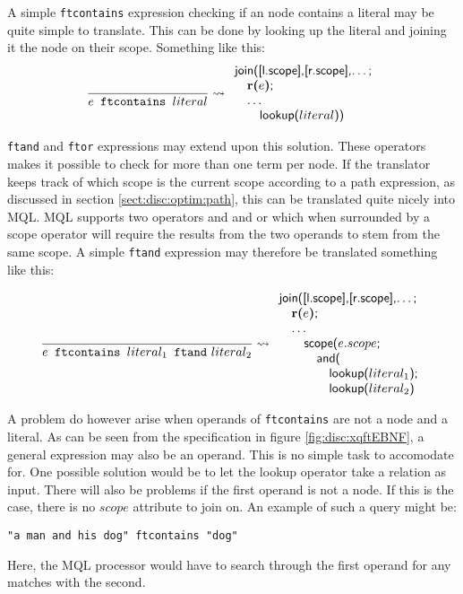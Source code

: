 A simple \texttt{ftcontains} expression checking if an node contains a literal may be quite simple to translate.
This can be done by looking up the literal and joining it the node on their scope. Something like this:
\begin{equation*}
\frac{}{e \mbox{\texttt{ ftcontains }}literal}\leadsto
\begin{array}{l}
\mbox{\textsf{join([l.scope],[r.scope],\ldots;}} \\ \quad
\mbox{\textbf{r(}}e\mbox{\textbf{)}\textsf{;}} \\ \quad
\mbox{\textsf{\ldots}} \\ \quad\quad
\mbox{\textsf{lookup(}}literal\textsf{))}
\end{array}
\end{equation*}

\texttt{ftand} and \texttt{ftor} expressions may extend upon this solution. These operators makes it possible to
check for more than one term per node. If the translator keeps track of which scope is the current scope according
to a path expression, as discussed in section \ref{sect:disc:optim:path}, this can be translated quite nicely into
MQL. MQL supports two operators \textsf{and} and \textsf{or} which when surrounded by a \textsf{scope} operator
will require the results from the two operands to stem from the same scope. A simple \texttt{ftand} expression may
therefore be translated something like this:

\begin{equation*}
\frac{}{e \mbox{\texttt{ ftcontains }}literal_1 \mbox{\texttt{ ftand} }literal_2}\leadsto
\begin{array}{l}
\mbox{\textsf{join([l.scope],[r.scope],\ldots;}} \\ \quad
\mbox{\textbf{r(}}e\mbox{\textbf{)}\textsf{;}} \\ \quad
\mbox{\textsf{\ldots}} \\ \quad\quad
\mbox{\textsf{scope(}}e.scope\mbox{\textsf{;}} \\ \quad\quad\quad
\mbox{\textsf{and(}} \\ \quad\quad\quad\quad
\mbox{\textsf{lookup(}}literal_1\textsf{);}\\ \quad\quad\quad\quad
\mbox{\textsf{lookup(}}literal_2\textsf{)}
\end{array}
\end{equation*}

A problem do however arise when operands of \texttt{ftcontains} are not a node and a literal. As can be seen from
the specification in figure \ref{fig:disc:xqftEBNF}, a general expression may also be an operand. This is no
simple task to accomodate for. One possible solution would be to let the \textsf{lookup} operator take a relation
as input. There will also be problems if the first operand is not a node. If this is the case, there is no $scope$
attribute to join on. An example of such a query might be: 
\begin{center}
\texttt{"a man and his dog" ftcontains "dog"}
\end{center}
Here, the MQL processor would have to search through the first operand for any matches with the second. 

